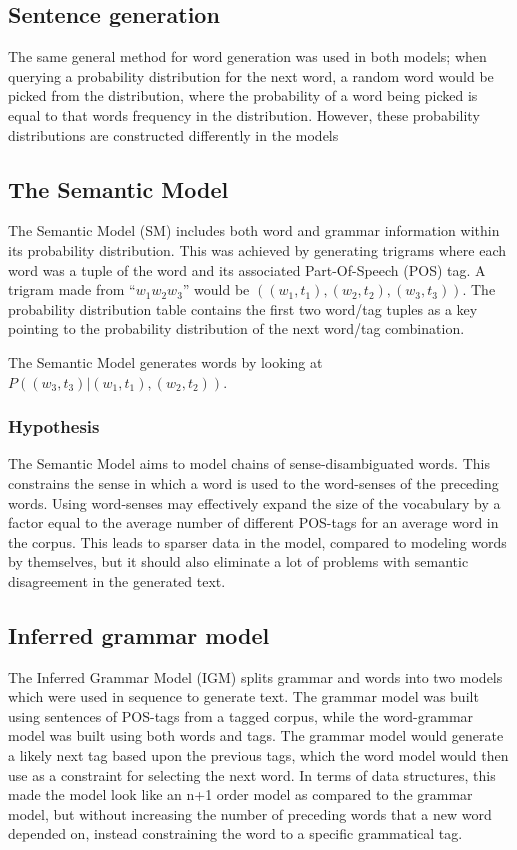 \documentclass[a4paper,12pt]{article}
\begin{document}
\subsection{Sentence generation}
The same general method for word generation was used in both models; when querying a probability distribution for the next word, a random word would be picked from the distribution, where the probability of a word being picked is equal to that words frequency in the distribution. However, these probability distributions are constructed differently in the models


\subsection{The Semantic Model}
The Semantic Model (SM) includes both word and grammar information within its probability distribution. This was achieved by generating trigrams where each word was a tuple of the word and its associated Part-Of-Speech (POS) tag. A trigram made from ``$w_1 w_2 w_3$'' would be $((w_1,t_1), (w_2, t_2), (w_3, t_3))$.
The probability distribution table contains the first two word/tag tuples as a key pointing to the probability distribution of the next word/tag combination. 

The Semantic Model generates words by looking at $P((w_3, t_3)|(w_1,t_1),(w_2, t_2))$.


\subsubsection{Hypothesis}
The Semantic Model aims to model chains of sense-disambiguated words. This constrains the sense in which a word is used to the word-senses of the preceding words. Using word-senses may effectively expand the size of the vocabulary by a factor equal to the average number of different POS-tags for an average word in the corpus. This leads to sparser data in the model, compared to modeling words by themselves, but it should also eliminate a lot of problems with semantic disagreement in the generated text.

\subsection{Inferred grammar model}
The Inferred Grammar Model (IGM) splits grammar and words into two models which were used in sequence to generate text. The grammar model was built using sentences of POS-tags from a tagged corpus, while the word-grammar model was built using both words and tags. The grammar model would generate a likely next tag based upon the previous tags, which the word model would then use as a constraint for selecting the next word. In terms of data structures, this made the model look like an n+1 order model as compared to the grammar model, but without increasing the number of preceding words that a new word depended on, instead constraining the word to a specific grammatical tag.
\end{document}
